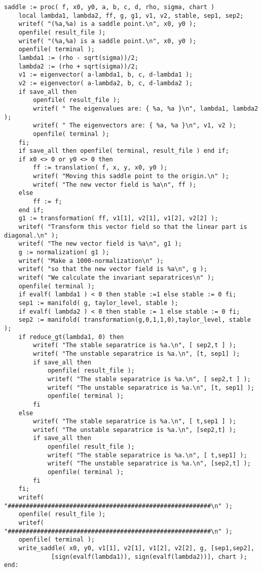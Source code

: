 \documentclass[a4paper,10pt]{article}
\begin{document}
\begin{lstlisting}[name=type]
saddle := proc( f, x0, y0, a, b, c, d, rho, sigma, chart )
    local lambda1, lambda2, ff, g, g1, v1, v2, stable, sep1, sep2;
    writef( "(%a,%a) is a saddle point.\n", x0, y0 );
    openfile( result_file );
    writef( "(%a,%a) is a saddle point.\n", x0, y0 );
    openfile( terminal );
    lambda1 := (rho - sqrt(sigma))/2;
    lambda2 := (rho + sqrt(sigma))/2;
    v1 := eigenvector( a-lambda1, b, c, d-lambda1 );
    v2 := eigenvector( a-lambda2, b, c, d-lambda2 );
    if save_all then
        openfile( result_file );
        writef( " The eigenvalues are: { %a, %a }\n", lambda1, lambda2 );
        writef( " The eigenvectors are: { %a, %a }\n", v1, v2 );
        openfile( terminal );
    fi;
    if save_all then openfile( terminal, result_file ) end if;
    if x0 <> 0 or y0 <> 0 then
        ff := translation( f, x, y, x0, y0 );
        writef( "Moving this saddle point to the origin.\n" );
        writef( "The new vector field is %a\n", ff );
    else
        ff := f;
    end if;
    g1 := transformation( ff, v1[1], v2[1], v1[2], v2[2] );
    writef( "Transform this vector field so that the linear part is diagonal.\n" );
    writef( "The new vector field is %a\n", g1 );
    g := normalization( g1 );
    writef( "Make a 1000-normalization\n" );
    writef( "so that the new vector field is %a\n", g );
    writef( "We calculate the invariant separatrices\n" );
    openfile( terminal );
    if evalf( lambda1 ) < 0 then stable :=1 else stable := 0 fi;
    sep1 := manifold( g, taylor_level, stable );
    if evalf( lambda2 ) < 0 then stable := 1 else stable := 0 fi;
    sep2 := manifold( transformation(g,0,1,1,0),taylor_level, stable );
    if reduce_gt(lambda1, 0) then
        writef( "The stable separatrice is %a.\n", [ sep2,t ] );
        writef( "The unstable separatrice is %a.\n", [t, sep1] );
        if save_all then
            openfile( result_file );
            writef( "The stable separatrice is %a.\n", [ sep2,t ] );
            writef( "The unstable separatrice is %a.\n", [t, sep1] );
            openfile( terminal );
        fi
    else
        writef( "The stable separatrice is %a.\n", [ t,sep1 ] );
        writef( "The unstable separatrice is %a.\n", [sep2,t] );
        if save_all then
            openfile( result_file );
            writef( "The stable separatrice is %a.\n", [ t,sep1] );
            writef( "The unstable separatrice is %a.\n", [sep2,t] );
            openfile( terminal );
        fi
    fi;
    writef( "########################################################\n" );
    openfile( result_file );
    writef( "########################################################\n" );
    openfile( terminal );
    write_saddle( x0, y0, v1[1], v2[1], v1[2], v2[2], g, [sep1,sep2],
             [sign(evalf(lambda1)), sign(evalf(lambda2))], chart );
end:
\end{lstlisting}
\end{document}
